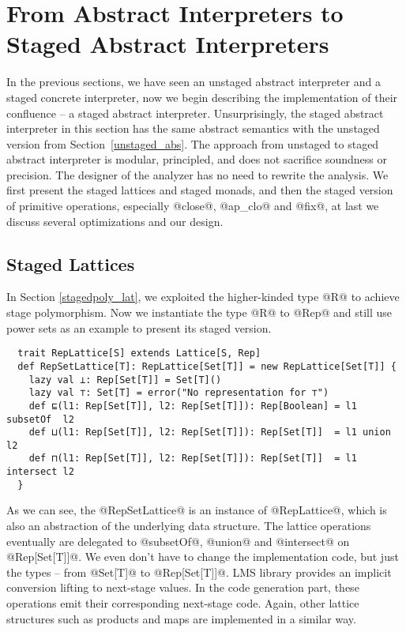 \section{From Abstract Interpreters to Staged Abstract Interpreters} \label{sai}

In the previous sections, we have seen an unstaged abstract interpreter and a
staged concrete interpreter, now we begin describing the implementation of their
confluence -- a staged abstract interpreter.
Unsurprisingly, the staged abstract interpreter in this section has the same
abstract semantics with the unstaged version from Section~\ref{unstaged_abs}.
The approach from unstaged to staged abstract interpreter is modular,
principled, and does not sacrifice soundness or precision. The designer of the
analyzer has no need to rewrite the analysis. We first present the staged
lattices and staged monads, and then the staged version of primitive operations,
especially @close@, @ap_clo@ and @fix@, at last we discuss several optimizations
and our design.

\subsection{Staged Lattices}

In Section \ref{stagedpoly_lat}, we exploited the higher-kinded type @R@ to
achieve stage polymorphism. Now we instantiate the type @R@ to @Rep@ and
still use power sets as an example to present its staged version.

\begin{lstlisting}
  trait RepLattice[S] extends Lattice[S, Rep]
  def RepSetLattice[T]: RepLattice[Set[T]] = new RepLattice[Set[T]] {
    lazy val ⊥: Rep[Set[T]] = Set[T]()
    lazy val ⊤: Set[T] = error("No representation for ⊤")
    def ⊑(l1: Rep[Set[T]], l2: Rep[Set[T]]): Rep[Boolean] = l1 subsetOf  l2
    def ⊔(l1: Rep[Set[T]], l2: Rep[Set[T]]): Rep[Set[T]]  = l1 union     l2
    def ⊓(l1: Rep[Set[T]], l2: Rep[Set[T]]): Rep[Set[T]]  = l1 intersect l2
  }
\end{lstlisting}

As we can see, the @RepSetLattice@ is an instance of @RepLattice@, which is also
an abstraction of the underlying data structure. The lattice operations
eventually are delegated to @subsetOf@, @union@ and @intersect@ on
@Rep[Set[T]]@. We even don't have to change the implementation code, but just
the types – from @Set[T]@ to @Rep[Set[T]]@. LMS library provides an implicit
conversion lifting to next-stage values. In the code generation part, these
operations emit their corresponding next-stage code. Again, other lattice
structures such as products and maps are implemented in a similar way.

